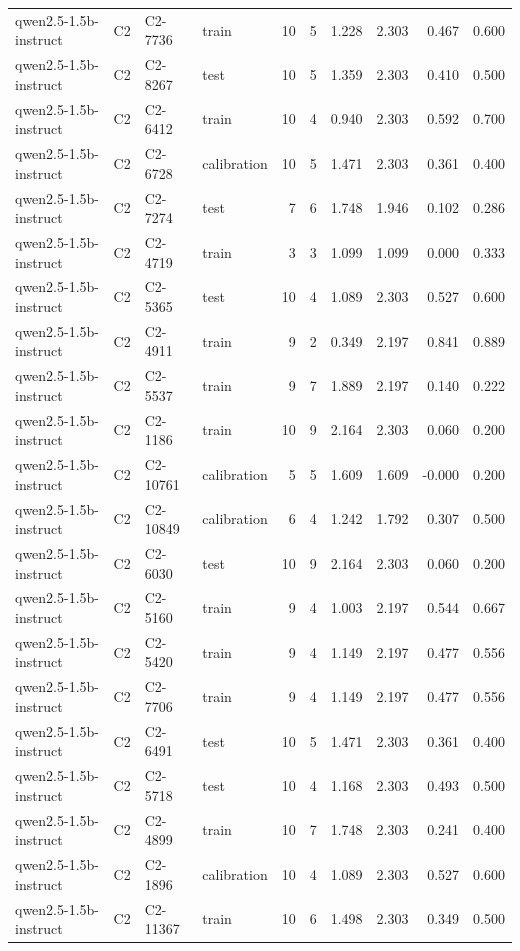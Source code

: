 \begin{table}
\begin{tabular}{llllrrrrrr}
qwen2.5-1.5b-instruct & C2 & C2-7736 & train & 10 & 5 & 1.228 & 2.303 & 0.467 & 0.600 \\
qwen2.5-1.5b-instruct & C2 & C2-8267 & test & 10 & 5 & 1.359 & 2.303 & 0.410 & 0.500 \\
qwen2.5-1.5b-instruct & C2 & C2-6412 & train & 10 & 4 & 0.940 & 2.303 & 0.592 & 0.700 \\
qwen2.5-1.5b-instruct & C2 & C2-6728 & calibration & 10 & 5 & 1.471 & 2.303 & 0.361 & 0.400 \\
qwen2.5-1.5b-instruct & C2 & C2-7274 & test & 7 & 6 & 1.748 & 1.946 & 0.102 & 0.286 \\
qwen2.5-1.5b-instruct & C2 & C2-4719 & train & 3 & 3 & 1.099 & 1.099 & 0.000 & 0.333 \\
qwen2.5-1.5b-instruct & C2 & C2-5365 & test & 10 & 4 & 1.089 & 2.303 & 0.527 & 0.600 \\
qwen2.5-1.5b-instruct & C2 & C2-4911 & train & 9 & 2 & 0.349 & 2.197 & 0.841 & 0.889 \\
qwen2.5-1.5b-instruct & C2 & C2-5537 & train & 9 & 7 & 1.889 & 2.197 & 0.140 & 0.222 \\
qwen2.5-1.5b-instruct & C2 & C2-1186 & train & 10 & 9 & 2.164 & 2.303 & 0.060 & 0.200 \\
qwen2.5-1.5b-instruct & C2 & C2-10761 & calibration & 5 & 5 & 1.609 & 1.609 & -0.000 & 0.200 \\
qwen2.5-1.5b-instruct & C2 & C2-10849 & calibration & 6 & 4 & 1.242 & 1.792 & 0.307 & 0.500 \\
qwen2.5-1.5b-instruct & C2 & C2-6030 & test & 10 & 9 & 2.164 & 2.303 & 0.060 & 0.200 \\
qwen2.5-1.5b-instruct & C2 & C2-5160 & train & 9 & 4 & 1.003 & 2.197 & 0.544 & 0.667 \\
qwen2.5-1.5b-instruct & C2 & C2-5420 & train & 9 & 4 & 1.149 & 2.197 & 0.477 & 0.556 \\
qwen2.5-1.5b-instruct & C2 & C2-7706 & train & 9 & 4 & 1.149 & 2.197 & 0.477 & 0.556 \\
qwen2.5-1.5b-instruct & C2 & C2-6491 & test & 10 & 5 & 1.471 & 2.303 & 0.361 & 0.400 \\
qwen2.5-1.5b-instruct & C2 & C2-5718 & test & 10 & 4 & 1.168 & 2.303 & 0.493 & 0.500 \\
qwen2.5-1.5b-instruct & C2 & C2-4899 & train & 10 & 7 & 1.748 & 2.303 & 0.241 & 0.400 \\
qwen2.5-1.5b-instruct & C2 & C2-1896 & calibration & 10 & 4 & 1.089 & 2.303 & 0.527 & 0.600 \\
qwen2.5-1.5b-instruct & C2 & C2-11367 & train & 10 & 6 & 1.498 & 2.303 & 0.349 & 0.500 \\

\end{tabular}
\end{table}
